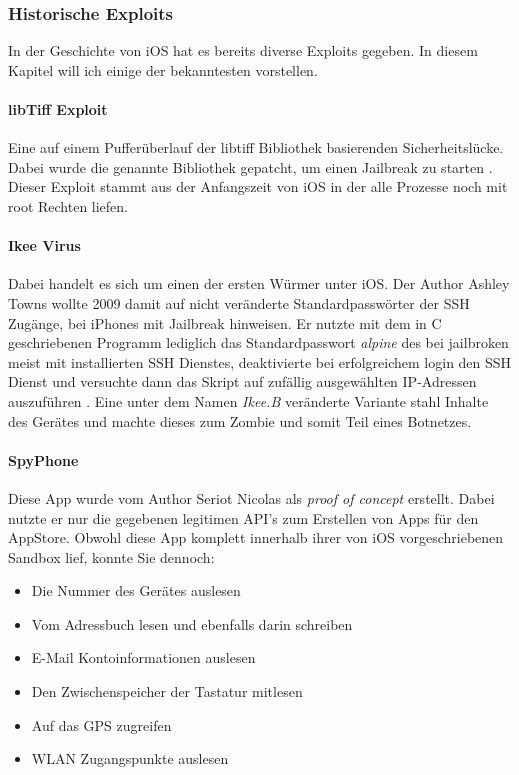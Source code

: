 	\subsubsection{Historische Exploits}
		In der Geschichte von iOS hat es bereits diverse Exploits \cite{Exploit2015}
		gegeben. In diesem Kapitel will ich einige der bekanntesten vorstellen.
		\paragraph{libTiff Exploit} 
			Eine auf einem Pufferüberlauf der libtiff Bibliothek basierenden
			Sicherheitslücke. Dabei wurde die genannte Bibliothek gepatcht, um einen
			Jailbreak zu starten \cite{LibTiffExploit2015}. Dieser Exploit
			stammt aus der Anfangszeit von iOS in der alle Prozesse noch mit root
			Rechten liefen.
		\paragraph{Ikee Virus}\label{sec:ikee-exploit}
			Dabei handelt es sich um einen der ersten Würmer unter iOS. Der	Author Ashley Towns
			wollte 2009 damit auf nicht veränderte Standardpasswörter der SSH Zugänge,
			bei iPhones mit Jailbreak hinweisen. Er nutzte mit dem in C geschriebenen
			Programm lediglich das Standardpasswort \textsl{alpine} des bei jailbroken
			meist mit installierten SSH Dienstes, deaktivierte bei erfolgreichem login
			den SSH Dienst und versuchte dann das Skript auf zufällig ausgewählten
			IP-Adressen auszuführen \cite{IkeeExploit2009}. Eine unter dem Namen
			\textsl{Ikee.B} veränderte Variante stahl Inhalte des Gerätes und machte
			dieses zum Zombie und somit Teil eines Botnetzes.
		\paragraph{SpyPhone}
			Diese App wurde vom Author Seriot Nicolas als
			\textsl{proof of concept} erstellt. Dabei nutzte er nur die gegebenen
			legitimen API's zum Erstellen von Apps für den AppStore. Obwohl diese App
			komplett innerhalb ihrer von iOS vorgeschriebenen Sandbox lief, konnte
			Sie dennoch:
			\begin{itemize}\itemsep0pt
				\item{Die Nummer des Gerätes auslesen}
				\item{Vom Adressbuch lesen und ebenfalls darin schreiben}
				\item{E-Mail Kontoinformationen auslesen}
				\item{Den Zwischenspeicher der Tastatur mitlesen}
				\item{Auf das GPS zugreifen}
				\item{WLAN Zugangspunkte auslesen}
			\end{itemize}
			
